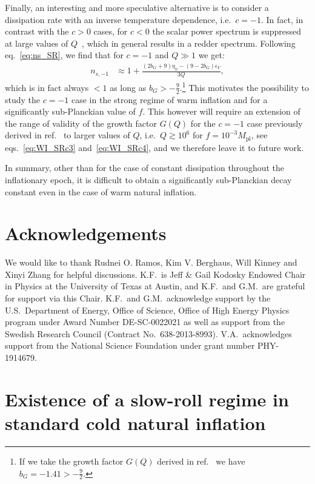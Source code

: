 \documentclass[a4paper,11pt]{article}
\begin{document}
Finally, an interesting and more speculative alternative is to consider a dissipation rate with an inverse temperature dependence, i.e.\ $c=-1$. In fact, in contrast with the $c>0$ cases, for $c<0$ the scalar power spectrum is suppressed at large values of $Q$~\cite{Bastero-Gil:2011rva}, which in general results in a redder spectrum. Following eq.~\eqref{eq:ns_SR}, we find that for $c=-1$ and $Q\gg 1$ we get:
\begin{align}
    n_{s,-1}&\approx 1+ \frac{(2b_G+9)\eta_V -(9-2b_G)\epsilon_V}{3Q}, \label{eq:ns_c-1}
\end{align}
which is in fact always $<1$ as long as $b_G>-\frac{9}{2}$.\footnote{If we take the growth factor $G(Q)$ derived in ref.~\cite{Motaharfar:2018zyb} we have $b_G=-1.41>-\frac{9}{2}$.} This motivates the possibility to study the $c=-1$ case in the strong regime of warm inflation and for a significantly sub-Planckian value of $f$. This however will require an extension of the range of validity of the growth factor $G(Q)$ for the $c=-1$ case previously derived in ref.~\cite{Motaharfar:2018zyb} to larger values of $Q$, i.e.\ $Q\gtrsim 10^{6}$ for $f=10^{-3}M_\mathrm{pl}$, see eqs.~\eqref{eq:WI_SRc3} and~\eqref{eq:WI_SRc4}, and we therefore leave it to future work.

In summary, other than for the case of constant dissipation throughout the inflationary epoch, it is difficult to obtain a significantly sub-Planckian decay constant even in the case of warm natural inflation.

\section*{Acknowledgements}
We would like to thank Rudnei O. Ramos, Kim V. Berghaus, Will Kinney and Xinyi Zhang for helpful discussions. K.F.\ is Jeff \& Gail Kodosky Endowed Chair in Physics at the University of Texas at Austin, and K.F.\ and G.M.\ are grateful for support via this Chair. K.F.\ and G.M.\ acknowledge support by the U.S.\ Department of Energy, Office of Science, Office of High Energy Physics program under Award Number DE-SC-0022021 as well as support from the Swedish Research Council (Contract No.~638-2013-8993). V.A.\ acknowledges support from the National Science Foundation under grant number PHY-1914679. 

\newpage
\appendix

\section{Existence of a slow-roll regime in standard cold natural inflation \label{appendix:A}}
\end{document}
